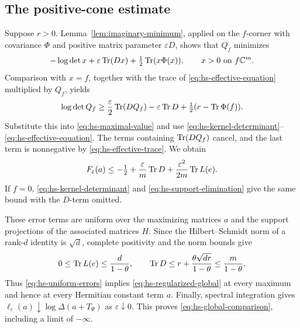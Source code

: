 \subsection{The positive-cone estimate}
Suppose $r>0$.
Lemma~\ref{lem:imaginary-minimum}, applied on the $f$-corner with covariance $\Phi$ and positive matrix parameter $\varepsilon D$, shows that $Q_f$ minimizes
\[
 -\log\det x+\varepsilon\operatorname{Tr}(Dx)+\tfrac12\operatorname{Tr}(x\Phi(x)),
 \qquad x>0\text{ on }f\mathbb C^m.
\]
Comparison with $x=f$, together with the trace of \eqref{eq:hs-effective-equation} multiplied by $Q_f$, yields
\[
 \log\det Q_f\ge\frac\varepsilon2\operatorname{Tr}(DQ_f)
       -\varepsilon\operatorname{Tr} D+\tfrac12(r-\operatorname{Tr}\Phi(f)).
\]
Substitute this into \eqref{eq:hs-maximal-value} and use \eqref{eq:hs-kernel-determinant}--\eqref{eq:hs-effective-equation}.
The terms containing $\operatorname{Tr}(DQ_f)$ cancel, and the last term is nonnegative by \eqref{eq:hs-effective-trace}.
We obtain
\begin{equation}\label{eq:hs-uniform-errors}
 F_\varepsilon(a)\le-\tfrac12+\frac\varepsilon m\operatorname{Tr} D
                          +\frac{\varepsilon^2}{2m}\operatorname{Tr} L(e).
\end{equation}
If $f=0$, \eqref{eq:hs-kernel-determinant} and \eqref{eq:hs-support-elimination} give the same bound with the $D$-term omitted.

These error terms are uniform over the maximizing matrices $a$ and the support projections of the associated matrices $H$.
Since the Hilbert--Schmidt norm of a rank-$d$ identity is $\sqrt d$, complete positivity and the norm bounds give
\[
 0\le\operatorname{Tr} L(e)\le\frac d{1-\theta},\qquad
 \operatorname{Tr} D\le r+\frac{\theta\sqrt{dr}}{1-\theta}
                  \le\frac m{1-\theta}.
\]
Thus \eqref{eq:hs-uniform-errors} implies \eqref{eq:hs-regularized-global} at every maximum and hence at every Hermitian constant term $a$.
Finally, spectral integration gives $\ell_\varepsilon(a)\downarrow\log\Delta(a+T_\Psi)$ as $\varepsilon\downarrow0$.
This proves \eqref{eq:hs-global-comparison}, including a limit of $-\infty$.
